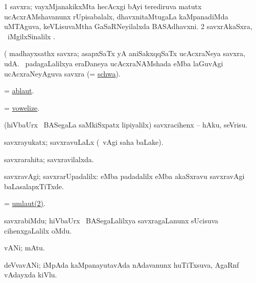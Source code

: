 \bentry
{} 
\gl{\nA}
\expl{}
\bmng
\bnum
\num{1} savxra; vayxMjanakikxMta hecAcxgi bAyi terediruva matutx ucAcxrAMshavanunx rUpisabalalx, dhavxnitaMtugaLa kaMpanadiMda uMTAguva, keVLisuvaMtha GaSaRNeyilalxda BASAdhavxni. 
\num{2} savxrAkaSxra, \udA\ iMgilxSinalilx . 
\enum
\emng

\noindent 
\gl{\pagu}
\expl{}
\bmng
  (    madhayxsathx savxra; asapxSaTx yA aniSakxqqSaTx ucAcxraNeya savxra, udA.  \mo\ padagaLalilxya eraDaneya ucAcxraNAMshada  eMba laGuvAgi ucAcxraNeyAguva savxra (= \hyperref{kandict_s.pdf}{S}{schwa}{schwa}). 
\emng
\eentry

\bentry
{}
\gl{\nA}
\expl{}
\bmng
 = \hyperref{kandict_a.pdf}{A}{ablaut}{ablaut}. 
\emng
\eentry

\bentry
{} 
\gl{\sakirx}
\expl{}
\bmng
 = \hyperlink{vowelize}{vowelize}. 
\emng
\eentry

\bentry
{} 
\gl{\sakirx}
\expl{}
\bmng
 (hiVbaUrx \mo\ BASegaLa saMkiSxpatx lipiyalilx) savxracihenx -- hAku, seVrisu. 
\emng
\eentry

\bentry
{} 
\gl{\gu}
\expl{}
\bmng
 savxrayukatx; savxravuLaLx (\saMpa\ vAgi saha baLake). 
\emng
\eentry

\bentry
{} 
\gl{\gu}
\expl{}
\bmng
 savxrarahita; savxravilalxda. 
\emng
\eentry

\bentry 
{} 
\gl{\kirxvi}
\expl{}
\bmng
 savxravAgi; savxrarUpadalilx:  eMba padadalilx  eMba akaSxravu savxravAgi baLasalapxTiTxde. 
\emng
\eentry

\bentry
{}
\gl{\nA}
\expl{}
\bmng
 = \hyperref{kandict_u.pdf}{U}{umlaut(2)}{umlaut(2)}. 
\emng
\eentry

\bentry
{} 
\pron{}
\gl{\nA}
\expl{}
\bmng
 savxrabiMdu; hiVbaUrx \mo\ BASegaLalilxya savxragaLanunx sUcisuva cihenxgaLalilx oMdu. 
\emng
\eentry

\bentry 
{} 
\gl{\nA}
\expl{}
\bmng
 vANi; mAtu. 
\emng
\eentry

\bentry 
{} 
\gl{\nA}
\expl{\Latin}
\bmng
deVvavANi; iMpAda kaMpanayutavAda nAdavanunx huTiTxsuva, AgaRnf vAdayxda kiVlu. 
\emng
\eentry

